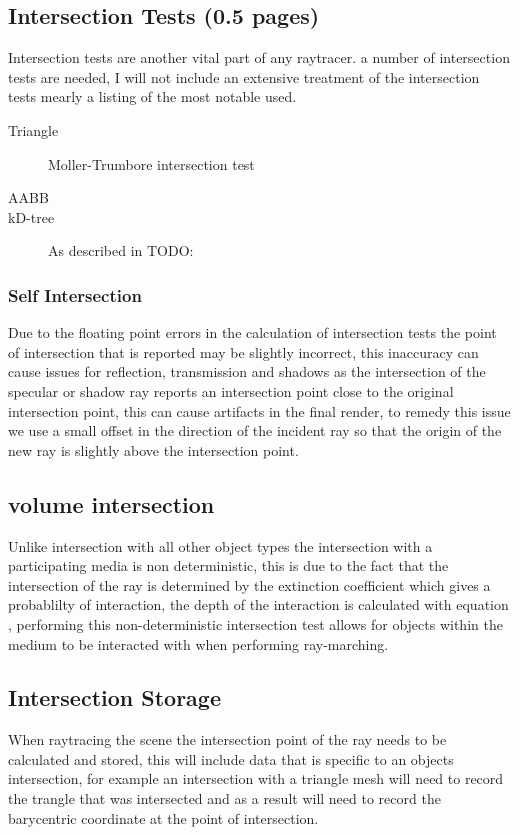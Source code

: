 \subsection{Intersection Tests (0.5 pages)}

Intersection tests are another vital part of any raytracer. a number of intersection tests are needed, I will not include
an extensive treatment of the intersection tests mearly a listing of the most notable used.

\begin{description}
\item[Triangle] Moller-Trumbore intersection test \cite{MolTru97}
\item[AABB]
\item[kD-tree] As described in TODO:
\end{description}

\subsubsection{Self Intersection}
Due to the floating point errors in the calculation of intersection tests the point of intersection that is reported may be
slightly incorrect, this inaccuracy can cause issues for reflection, transmission and shadows as the intersection of the
specular or shadow ray reports an intersection point close to the original intersection point, this can cause artifacts in
the final render, to remedy this issue we use a small offset in the direction of the incident ray so that the origin of the
new ray is slightly above the intersection point.

\subsection{volume intersection}
Unlike intersection with all other object types the intersection with a participating media is non deterministic, this is
due to the fact that the intersection of the ray is determined by the extinction coefficient which gives a probablilty
of interaction, the depth of the interaction is calculated with equation , performing this non-deterministic
intersection test allows for objects within the medium to be interacted with when performing ray-marching.


\subsection{Intersection Storage}
When raytracing the scene the intersection point of the ray needs to be calculated and stored, this will include data that
is specific to an objects intersection, for example an intersection with a triangle mesh will need to record the trangle
that was intersected and as a result will need to record the barycentric coordinate at the point of intersection.

